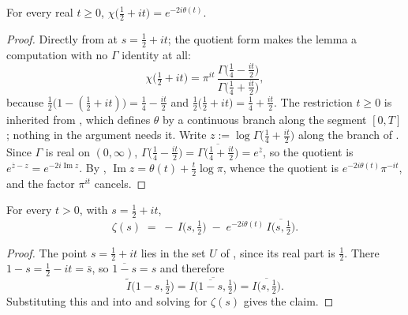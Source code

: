 \begin{lemma}
\label{lem:rsz_chi_theta}
\leanok
{}
For every real $t\ge0$, $\chi\bigl(\tfrac12+it\bigr)=e^{-2i\theta(t)}$.
\end{lemma}

\begin{proof}
\leanok
Directly from  at $s=\tfrac12+it$; the quotient form makes the lemma a
computation with no $\Gamma$ identity at all:
\[
  \chi\bigl(\tfrac12+it\bigr)=\pi^{it}\,
    \frac{\Gamma\bigl(\tfrac14-\tfrac{it}2\bigr)}{\Gamma\bigl(\tfrac14+\tfrac{it}2\bigr)} ,
\]
because $\tfrac12\bigl(1-(\tfrac12+it)\bigr)=\tfrac14-\tfrac{it}2$ and
$\tfrac12\bigl(\tfrac12+it\bigr)=\tfrac14+\tfrac{it}2$.  The restriction $t\ge0$ is inherited
from , which defines $\theta$ by a continuous branch along the segment
$[0,T]$; nothing in the argument needs it.
Write $z:=\log\Gamma\bigl(\tfrac14+\tfrac{it}2\bigr)$ along the branch of
.  Since $\Gamma$ is real on $(0,\infty)$,
$\Gamma\bigl(\tfrac14-\tfrac{it}2\bigr)=\overline{\Gamma\bigl(\tfrac14+\tfrac{it}2\bigr)}
=e^{\overline z}$, so the quotient is $e^{\overline z-z}=e^{-2i\operatorname{Im}z}$.  By
, $\operatorname{Im}z=\theta(t)+\tfrac t2\log\pi$, whence the quotient is
$e^{-2i\theta(t)}\pi^{-it}$, and the factor $\pi^{it}$ cancels.
\end{proof}

\begin{theorem}
\label{thm:rsz_siegel}
\leanok
{}
For every $t>0$, with $s=\tfrac12+it$,
\[
  \zeta(s)\;=\;-\,I\bigl(s,\tfrac12\bigr)\;-\;e^{-2i\theta(t)}\,\overline{I\bigl(s,\tfrac12\bigr)} .
\]
\end{theorem}

\begin{proof}
\leanok
The point $s=\tfrac12+it$ lies in the set $U$ of , since its real part
is $\tfrac12$.  There $1-s=\tfrac12-it=\overline s$, so
$\overline{1-s}=s$ and therefore
\[
  \widetilde I\bigl(1-s,\tfrac12\bigr)=\overline{I\bigl(\overline{1-s},\tfrac12\bigr)}
    =\overline{I\bigl(s,\tfrac12\bigr)} .
\]
Substituting this and  into  and solving for
$\zeta(s)$ gives the claim.
\end{proof}

